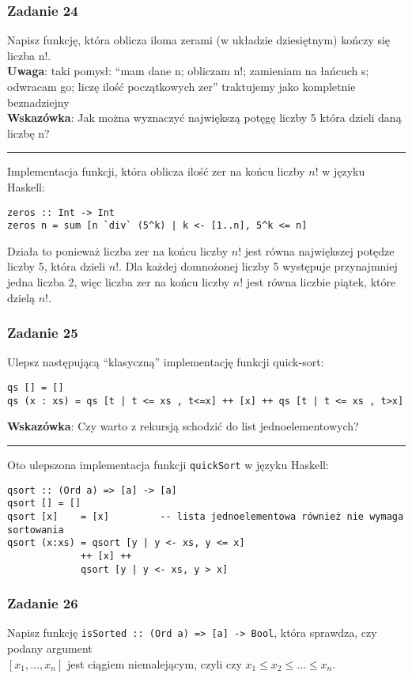 \documentclass[11pt,a4paper]{article}
\begin{document}
\subsubsection{Zadanie 24}
Napisz funkcję, która oblicza iloma zerami (w układzie dziesiętnym) kończy się liczba n!. \\
\textbf{Uwaga}: taki pomysł: ``mam dane n; obliczam n!; zamieniam na łańcuch s; odwracam go; liczę ilość początkowych zer'' traktujemy jako kompletnie beznadziejny \\
\textbf{Wskazówka}: Jak można wyznaczyć największą potęgę liczby 5 która dzieli daną liczbę n? 

\bigskip
\hrule
\bigskip

Implementacja funkcji, która oblicza ilość zer na końcu liczby \(n!\) w języku Haskell:
\begin{Verbatim}[frame=single]
zeros :: Int -> Int
zeros n = sum [n `div` (5^k) | k <- [1..n], 5^k <= n]
\end{Verbatim}
Działa to ponieważ liczba zer na końcu liczby \(n!\) jest równa największej potędze liczby 5, która dzieli \(n!\). Dla każdej domnożonej liczby 5 występuje przynajmniej jedna liczba 2, więc liczba zer na końcu liczby \(n!\) jest równa liczbie piątek, które dzielą \(n!\).

\subsubsection{Zadanie 25}
Ulepsz następującą ``klasyczną'' implementację funkcji quick-sort:
\begin{Verbatim}[frame=single]
qs [] = []
qs (x : xs) = qs [t | t <= xs , t<=x] ++ [x] ++ qs [t | t <= xs , t>x]
\end{Verbatim}
\textbf{Wskazówka}: Czy warto z rekursją schodzić do list jednoelementowych?

\bigskip
\hrule
\bigskip

Oto ulepszona implementacja funkcji \texttt{quickSort} w języku Haskell:
\begin{Verbatim}[frame=single]
qsort :: (Ord a) => [a] -> [a]
qsort [] = []
qsort [x]    = [x]         -- lista jednoelementowa również nie wymaga sortowania
qsort (x:xs) = qsort [y | y <- xs, y <= x]
             ++ [x] ++
             qsort [y | y <- xs, y > x]
\end{Verbatim}

\subsubsection{Zadanie 26}
Napisz funkcję \texttt{isSorted :: (Ord a) => [a] -> Bool}, która sprawdza, czy podany
argument \\$[x_1, \dots, x_n]$ jest ciągiem niemalejącym, czyli czy $x_1 \leq x_2 \leq \dots \leq x_n$.
\end{document}
